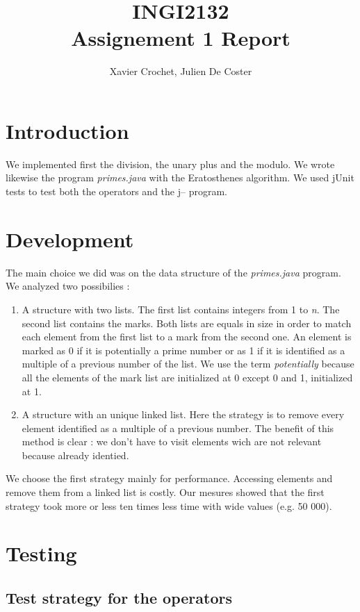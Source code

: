 \documentclass[10pt,a4paper]{article}
\author{Xavier Crochet, Julien De Coster}
\title{INGI2132 \\ Assignement 1 Report}
\begin{document}
\maketitle

\section{Introduction}

We implemented first the division, the unary plus and the modulo. We wrote likewise the program \emph{primes.java} with the Eratosthenes algorithm. We used jUnit tests to test both the operators and the j-- program.

\section{Development}

The main choice we did was on the data structure of the \emph{primes.java} program. We analyzed two possibilies :

\begin{enumerate}
\item{A structure with two lists. The first list contains integers from 1 to \emph{n}. The second list contains the marks. Both lists are equals in size in order to match each element from the first list to a mark from the second one. An element is marked as 0 if it is potentially a prime number or as 1 if it is identified as a multiple of a previous number of the list. We use the term \emph{potentially} because all the elements of the mark list are initialized at 0 except 0 and 1, initialized at 1.}

\item {A structure with an unique linked list. Here the strategy is to remove every element identified as a multiple of a previous number. The benefit of this method is clear : we don't have to visit elements wich are not relevant because already identied.}
\end{enumerate}

We choose the first strategy mainly for performance. Accessing elements and remove them from a linked list is costly. Our mesures showed that the first strategy took more or less ten times less time with wide values (e.g. 50 000).

\section{Testing}
\subsection{Test strategy for the operators}
\end{document}
